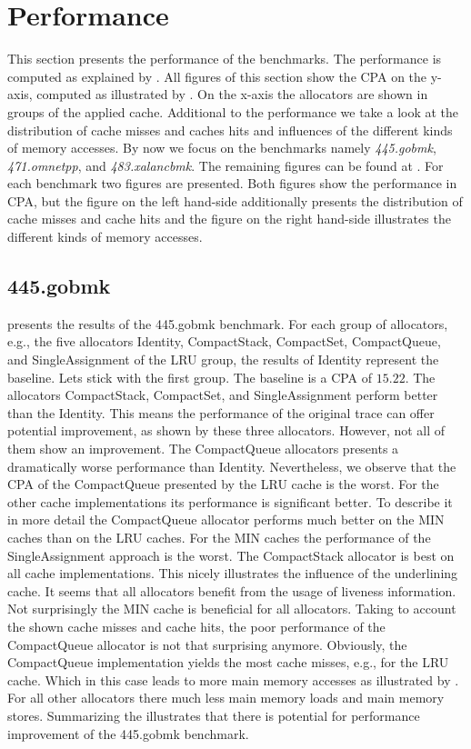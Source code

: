 \documentclass[onecolumn, openright, master, english, signatures]{dbrgrptt}
\begin{document}
\section{Performance}\label{sec:experiment-performance}

This section presents the performance of the benchmarks.
The performance is computed as explained by .
All figures of this section show the \ac{CPA} on the y-axis, computed as illustrated by .
On the x-axis the allocators are shown in groups of the applied cache.
Additional to the performance we take a look at the distribution of cache misses and caches hits and influences of the different kinds of memory accesses.
By now we focus on the benchmarks namely \emph{445.gobmk}, \emph{471.omnetpp}, and \emph{483.xalancbmk}.
The remaining figures can be found at .
For each benchmark two figures are presented.
Both figures show the performance in \ac{CPA}, but the figure on the left hand-side additionally presents the distribution of cache misses and cache hits and the figure on the right hand-side illustrates the different kinds of memory accesses.

\subsection{445.gobmk}
 presents the results of the 445.gobmk benchmark.
For each group of allocators, e.g., the five allocators Identity, CompactStack, CompactSet, CompactQueue, and SingleAssignment of the \ac{LRU} group, the results of Identity represent the baseline.
Lets stick with the first group.
The baseline is a CPA of $15.22$.
The allocators CompactStack, CompactSet, and SingleAssignment perform better than the Identity.
This means the performance of the original \ac{trace} can offer potential improvement, as shown by these three allocators.
However, not all of them show an improvement.
The CompactQueue allocators presents a dramatically worse performance than Identity.
Nevertheless, we observe that the \ac{CPA} of the CompactQueue presented by the \ac{LRU} cache is the worst.
For the other cache implementations its performance is significant better.
To describe it in more detail the CompactQueue allocator performs much better on the MIN caches than on the \ac{LRU} caches.
For the MIN caches the performance of the SingleAssignment approach is the worst.
The CompactStack allocator is best on all cache implementations.
This nicely illustrates the influence of the underlining cache.
It seems that all allocators benefit from the usage of liveness information.
Not surprisingly the MIN cache is beneficial for all allocators.
Taking to account the shown cache misses and cache hits, the poor performance of the CompactQueue allocator is not that surprising anymore.
Obviously, the CompactQueue implementation yields the most cache misses, e.g., for the \ac{LRU} cache.
Which in this case leads to more main memory accesses as illustrated by .
For all other allocators there much less main memory loads and main memory stores.
Summarizing the  illustrates that there is potential for performance improvement of the 445.gobmk benchmark.
\end{document}
